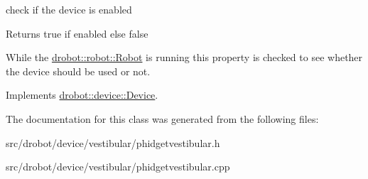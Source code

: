 check if the device is enabled 

\begin{DoxyReturn}{Returns}
true if enabled else false
\end{DoxyReturn}
While the \hyperlink{classdrobot_1_1robot_1_1Robot}{drobot\-::robot\-::\-Robot} is running this property is checked to see whether the device should be used or not. 

Implements \hyperlink{classdrobot_1_1device_1_1Device_aa5b7eac8638d0d2d5ee9bf10607b100e}{drobot\-::device\-::\-Device}.



The documentation for this class was generated from the following files\-:\begin{DoxyCompactItemize}
\item 
src/drobot/device/vestibular/phidgetvestibular.\-h\item 
src/drobot/device/vestibular/phidgetvestibular.\-cpp\end{DoxyCompactItemize}
